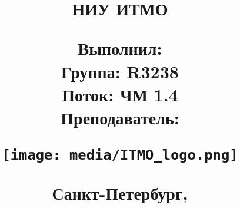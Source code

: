 \begin{titlepage}

\thispagestyle{empty}

\title{

НИУ ИТМО 
\vspace{4em}

\begin{center}
\LARGE{\textbf{\name}}

\vspace{1em}
\subname

\end{center}


\begin{flushright}
\large{ 
Выполнил: \textbf{\madeby} \\
Группа: \textbf{R3238} \\
Поток:  \textbf{ЧМ 1.4} \\
Преподаватель: \textbf{\teacher} 
}
\end{flushright}	

\vfill

\texttt{[image: media/ITMO\_logo.png]} 

\begin{center}
\normalsize{Санкт-Петербург, \the\year}
\end{center}
}

\date{}
\maketitle
\thispagestyle{empty}
\end{titlepage}